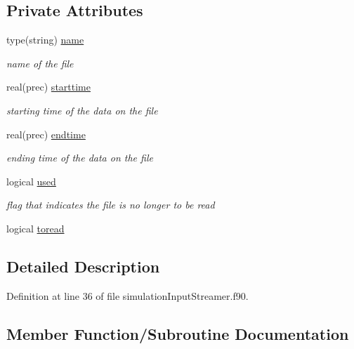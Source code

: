 \subsection*{Private Attributes}
\begin{DoxyCompactItemize}
\item 
type(string) \mbox{\hyperlink{structsimulationinputstreamer__mod_1_1inputfilemodel__class_a882b0dfc49829e8a04905a7ead0e97a3}{name}}
\begin{DoxyCompactList}\small\item\em name of the file \end{DoxyCompactList}\item 
real(prec) \mbox{\hyperlink{structsimulationinputstreamer__mod_1_1inputfilemodel__class_a722618dceb1aeba15c68e5313a14405f}{starttime}}
\begin{DoxyCompactList}\small\item\em starting time of the data on the file \end{DoxyCompactList}\item 
real(prec) \mbox{\hyperlink{structsimulationinputstreamer__mod_1_1inputfilemodel__class_ad25a4514610666475497835d54346a76}{endtime}}
\begin{DoxyCompactList}\small\item\em ending time of the data on the file \end{DoxyCompactList}\item 
logical \mbox{\hyperlink{structsimulationinputstreamer__mod_1_1inputfilemodel__class_a003333db579141a5b52c141b591cc86b}{used}}
\begin{DoxyCompactList}\small\item\em flag that indicates the file is no longer to be read \end{DoxyCompactList}\item 
logical \mbox{\hyperlink{structsimulationinputstreamer__mod_1_1inputfilemodel__class_a240b7aa50c7f8a2b5e67b40a0652c5ac}{toread}}
\end{DoxyCompactItemize}


\subsection{Detailed Description}


Definition at line 36 of file simulation\+Input\+Streamer.\+f90.



\subsection{Member Function/\+Subroutine Documentation}
\mbox{\label{structsimulationinputstreamer__mod_1_1inputfilemodel__class_a3761f6ea173cbede69de2ad1b3f94ac6}} 
